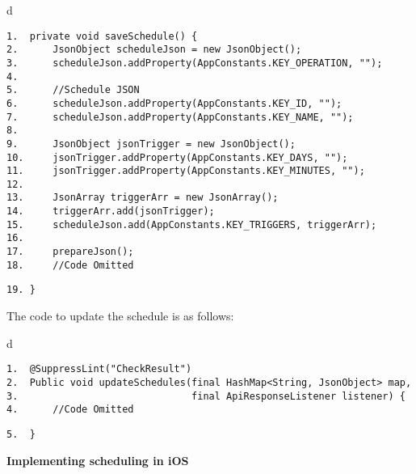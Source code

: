 \documentclass[a4paper,12pt]{book}
\begin{document}
\begin{codebloc}
\begin{tabular}{d}
\vspace{2pt}
\begin{verbatim}
1.  private void saveSchedule() {
2.      JsonObject scheduleJson = new JsonObject();
3.      scheduleJson.addProperty(AppConstants.KEY_OPERATION, "");
4.	
5.      //Schedule JSON
6.      scheduleJson.addProperty(AppConstants.KEY_ID, "");
7.      scheduleJson.addProperty(AppConstants.KEY_NAME, "");
8.
9.      JsonObject jsonTrigger = new JsonObject();
10.     jsonTrigger.addProperty(AppConstants.KEY_DAYS, "");
11.     jsonTrigger.addProperty(AppConstants.KEY_MINUTES, "");
12.	
13.     JsonArray triggerArr = new JsonArray();
14.     triggerArr.add(jsonTrigger);
15.     scheduleJson.add(AppConstants.KEY_TRIGGERS, triggerArr);
16.	
17.     prepareJson();
18.     //Code Omitted
\end{verbatim}
\verb|19. }|
\end{tabular}
\end{codebloc}

The code to update the schedule is as follows:

\begin{codebloc}
\begin{tabular}{d}
\vspace{2pt}
\begin{verbatim}
1.  @SuppressLint("CheckResult")
2.  Public void updateSchedules(final HashMap<String, JsonObject> map,
3.                              final ApiResponseListener listener) {
4.      //Code Omitted
\end{verbatim}
\verb|5.  }|
\end{tabular}
\end{codebloc}


\textbf{Implementing scheduling in iOS}

\end{document}
